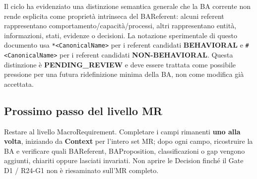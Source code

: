 \documentclass[11pt,a4paper]{article}
\newcommand{\bbeh}[1]{\texttt{*<#1>}}
\newcommand{\bnon}[1]{\texttt{\#<#1>}}
\begin{document}
Il ciclo ha evidenziato una distinzione semantica generale che la BA corrente non rende esplicita come propriet\`a intrinseca del BAReferent: alcuni referent rappresentano comportamento/capacit\`a/processi, altri rappresentano entit\`a, informazioni, stati, evidenze o decisioni. La notazione sperimentale di questo documento usa \bbeh{CanonicalName} per i referent candidati \textbf{BEHAVIORAL} e \bnon{CanonicalName} per i referent candidati \textbf{NON-BEHAVIORAL}. Questa distinzione \`e \textbf{PENDING\_REVIEW} e deve essere trattata come possibile pressione per una futura ridefinizione minima della BA, non come modifica gi\`a accettata.

\subsection*{Prossimo passo del livello MR}

Restare al livello MacroRequirement. Completare i campi rimanenti \textbf{uno alla volta}, iniziando da \textbf{Context} per l'intero set MR; dopo ogni campo, ricostruire la BA e verificare quali BAReferent, BAProposition, classificazioni o gap vengono aggiunti, chiariti oppure lasciati invariati. Non aprire le Decision finch\'e il Gate D1 / R24-G1 non \`e riesaminato sull'MR completo.
\end{document}

